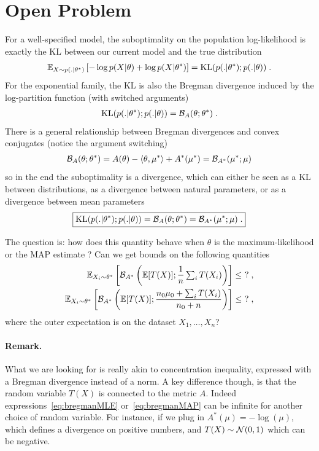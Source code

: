 \documentclass{article}
\newcommand*{\expect}[2][]{\ensuremath{\mathbb{E}_{#1} \left[ #2 \right] }} %
\newcommand{\logpart}{A}
\newcommand{\conj}{\logpart^*}
\newcommand{\bregman}{\cB_\logpart}
\newcommand{\bregmanconj}{\cB_{\logpart^*}}
\newcommand{\nat}{\theta}
\newcommand{\meanp}{\mu}
\begin{document}
\section{Open Problem}
For a well-specified model, the suboptimality on the population log-likelihood is exactly the KL between our current model and the true distribution
\begin{align}
    \expect[X\sim p(.|\nat^*)]{-\log p(X|\nat) + \log p(X|\nat^*) }
	= \KL( p(.|\nat^*) ; p(.|\nat)) \; .
\end{align}
For the exponential family, the KL is also the Bregman divergence induced by the log-partition function (with switched arguments)
\begin{align}
	\KL( p(.|\nat^*) ; p(.|\nat)) 
	= \bregman (\nat ; \nat^*)  \; .
\end{align}
There is a general relationship between Bregman divergences and convex conjugates (notice the argument switching)
\begin{align}
	\bregman (\nat ; \nat^*)
    = \logpart(\nat) - \langle \nat , \mu^* \rangle + \conj(\mu^*)
    = \bregmanconj ( \meanp^* ; \meanp)
\end{align}
so in the end the suboptimality is a divergence, which can either be seen as a KL between distributions, as a divergence between natural parameters, or as a divergence between mean parameters
\begin{align}
\boxed{
	\KL( p(.|\nat^*) ; p(.|\nat))
    = \bregman (\nat ; \nat^*)
    = \bregmanconj ( \meanp^* ; \meanp) \; .
}
\end{align}
\begin{important}
The question is: how does this quantity behave when $\nat$ is the maximum-likelihood or the MAP estimate ? Can we get bounds on the following quantities
\begin{align}
	\label{eq:bregmanMLE}
	\expect[X_i\sim \nat^*]{\bregmanconj \left (\E [T(X)] ;  \inv{n}  \smallsum_i T(X_i) \right )} \leq \ ? \; , \\
	\label{eq:bregmanMAP}
	\expect[X_i\sim \nat^*]{\bregmanconj \left (\E [T(X)] ; \frac{n_0 \mu_0 + \smallsum_i T(X_i)}{n_0+n} \right )} \leq \ ? \; ,
\end{align}
where the outer expectation is on the dataset $X_1, \dots, X_n$?
\end{important}

\paragraph{Remark.}
What we are looking for is really akin to concentration inequality, expressed with a Bregman divergence instead of a norm. A key difference though, is that the random variable $T(X)$ is connected to the metric $\logpart$. Indeed expressions~\eqref{eq:bregmanMLE} or~\eqref{eq:bregmanMAP} can be infinite for another choice of random variable. For instance, if we plug in $\conj(\mu)= -\log(\mu)$, which defines a divergence on positive numbers, and $T(X) \sim {\mathcal N}(0,1)$ which can be negative.
\end{document}

